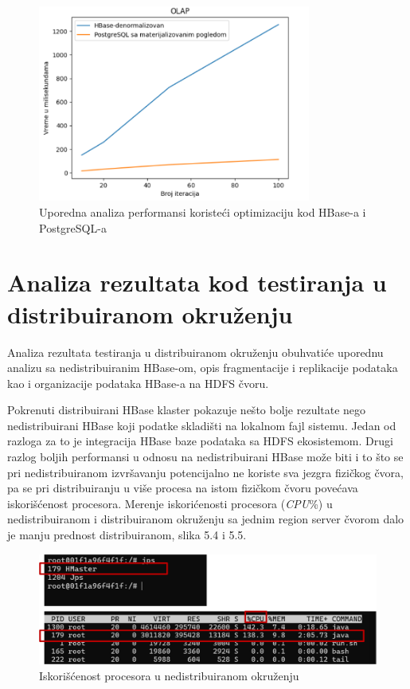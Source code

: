 \documentclass[12pt,oneside]{memoir}
\begin{document}
\begin{figure}[!ht]
  \centering
  \includegraphics[width=0.8\textwidth]{mv-denormalizerd.png}
  \caption{Uporedna analiza performansi koristeći optimizaciju kod HBase-a  i PostgreSQL-a}
  \label{fig:grafikon}
\end{figure}


\section{Analiza rezultata kod testiranja u distribuiranom okruženju}

Analiza rezultata testiranja u distribuiranom okruženju obuhvatiće uporednu analizu sa nedistribuiranim HBase-om, opis fragmentacije i replikacije podataka kao i organizacije podataka HBase-a na HDFS čvoru. 

Pokrenuti distribuirani HBase klaster pokazuje nešto bolje rezultate nego nedistribuirani HBase koji podatke skladišti na lokalnom fajl sistemu. Jedan od razloga za to je integracija HBase baze podataka sa HDFS ekosistemom\cite{hbaseGuide}.  Drugi razlog boljih performansi u odnosu na nedistribuirani HBase može biti i to što se pri nedistribuiranom izvršavanju potencijalno ne koriste sva jezgra fizičkog čvora, pa se pri distribuiranju u više procesa na istom fizičkom čvoru povećava iskorišćenost procesora. Merenje iskorićenosti procesora (\textit{CPU}\%) u nedistribuiranom i distribuiranom okruženju sa jednim region server čvorom dalo je manju prednost distribuiranom, slika 5.4 i 5.5. 

\begin{figure}[!ht]
  \centering
  \includegraphics[width=1\textwidth]{nedistribuiro-cpu.png}
  \caption{Iskorišćenost procesora u nedistribuiranom okruženju}
  \label{fig:grafikon}
\end{figure}
\end{document}
